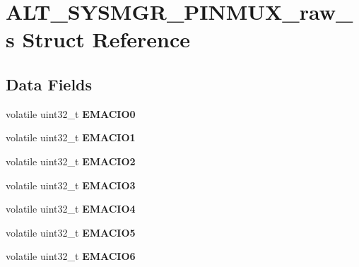 \hypertarget{structALT__SYSMGR__PINMUX__raw__s}{}\section{A\+L\+T\+\_\+\+S\+Y\+S\+M\+G\+R\+\_\+\+P\+I\+N\+M\+U\+X\+\_\+raw\+\_\+s Struct Reference}
\label{structALT__SYSMGR__PINMUX__raw__s}
\subsection*{Data Fields}
\begin{DoxyCompactItemize}
\item 
\mbox{\label{structALT__SYSMGR__PINMUX__raw__s_aee291c167f44f70a9b5bad16c4983461}} 
volatile uint32\+\_\+t {\bfseries E\+M\+A\+C\+I\+O0}
\item 
\mbox{\label{structALT__SYSMGR__PINMUX__raw__s_a3b5bc1069ecde6b9eebe3a8a33908545}} 
volatile uint32\+\_\+t {\bfseries E\+M\+A\+C\+I\+O1}
\item 
\mbox{\label{structALT__SYSMGR__PINMUX__raw__s_a602b4564862a47ef3280e21a0eeedbac}} 
volatile uint32\+\_\+t {\bfseries E\+M\+A\+C\+I\+O2}
\item 
\mbox{\label{structALT__SYSMGR__PINMUX__raw__s_a35ab9cba8bf25dc2abd7f13755f82e56}} 
volatile uint32\+\_\+t {\bfseries E\+M\+A\+C\+I\+O3}
\item 
\mbox{\label{structALT__SYSMGR__PINMUX__raw__s_adf6effeee06bee7730cba5dca7e5a5ac}} 
volatile uint32\+\_\+t {\bfseries E\+M\+A\+C\+I\+O4}
\item 
\mbox{\label{structALT__SYSMGR__PINMUX__raw__s_a5930c8812d70ea4a04ded4b5cd499e37}} 
volatile uint32\+\_\+t {\bfseries E\+M\+A\+C\+I\+O5}
\item 
\mbox{\label{structALT__SYSMGR__PINMUX__raw__s_ad18c76349fe66d55a60b013bd7201a73}} 
volatile uint32\+\_\+t {\bfseries E\+M\+A\+C\+I\+O6}
\item 
\mbox{\label{structALT__SYSMGR__PINMUX__raw__s_a835b17329f388dd5c1c3ea5835037b2a}} 

\end{DoxyCompactItemize}
